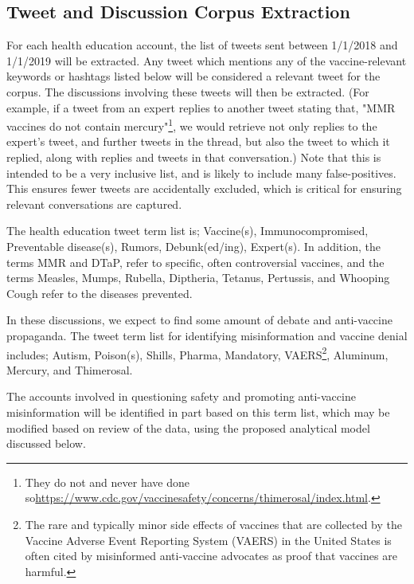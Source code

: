 \documentclass{article}
\begin{document}
\subsection{Tweet and Discussion Corpus Extraction}

For each health education account, the list of tweets sent between 1/1/2018 and 1/1/2019 will be extracted. Any tweet which mentions any of the vaccine-relevant keywords or hashtags listed below will be considered a relevant tweet for the corpus. The discussions involving these tweets will then be extracted. (For example, if a tweet from an expert replies to another tweet stating that, "MMR vaccines do not contain mercury"\footnote{They do not and never have done so\url{https://www.cdc.gov/vaccinesafety/concerns/thimerosal/index.html}.}, we would retrieve not only replies to the expert's tweet, and further tweets in the thread, but also the tweet to which it replied, along with replies and tweets in that conversation.) Note that this is intended to be a very inclusive list, and is likely to include many false-positives. This ensures fewer tweets are accidentally excluded, which is critical for ensuring relevant conversations are captured.

The health education tweet term list is; Vaccine(s), Immunocompromised, Preventable disease(s), Rumors, Debunk(ed/ing), Expert(s). In addition, the terms MMR and DTaP, refer to specific, often controversial vaccines, and the terms Measles, Mumps, Rubella, Diptheria, Tetanus, Pertussis, and Whooping Cough refer to the diseases prevented.

In these discussions, we expect to find some amount of debate and anti-vaccine propaganda. The tweet term list for identifying misinformation and vaccine denial includes; Autism, Poison(s), Shills, Pharma, Mandatory, VAERS\footnote{The rare and typically minor side effects of vaccines that are collected by the Vaccine Adverse Event Reporting System (VAERS) in the United States is often cited by misinformed anti-vaccine advocates as proof that vaccines are harmful.}, Aluminum, Mercury, and Thimerosal.

The accounts involved in questioning safety and promoting anti-vaccine misinformation will be identified in part based on this term list, which may be modified based on review of the data, using the proposed analytical model discussed below.
\end{document}
